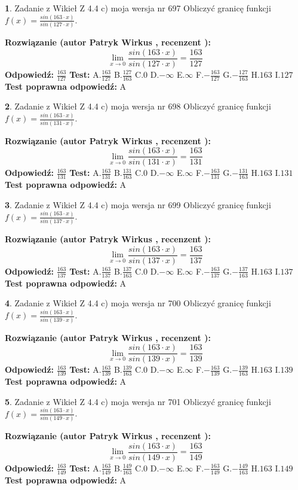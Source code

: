 \documentclass[12pt, a4paper]{article}
\theoremstyle{definition} %
\newtheorem{zad}{}
\newcommand{\zadStart}[1]{\begin{zad}#1\newline}
\newcommand{\zadStop}{\end{zad}}
\newcommand{\rozwStart}[2]{\noindent \textbf{Rozwiązanie (autor #1 , recenzent #2): }\newline}
\newcommand{\rozwStop}{\newline}
\newcommand{\odpStart}{\noindent \textbf{Odpowiedź:}\newline}
\newcommand{\odpStop}{\newline}
\newcommand{\testStart}{\noindent \textbf{Test:}\newline}
\newcommand{\testStop}{\newline}
\newcommand{\kluczStart}{\noindent \textbf{Test poprawna odpowiedź:}\newline}
\newcommand{\kluczStop}{\newline}
\begin{document}
\zadStart{Zadanie z Wikieł Z 4.4 c) moja wersja nr 697}
Obliczyć granicę funkcji $f(x)=\frac{sin(163\cdot x)}{sin(127\cdot x)}$.
\zadStop
\rozwStart{Patryk Wirkus}{}
$$\lim\limits_{x\to 0}\frac{sin(163\cdot x)}{sin(127\cdot x)}=
\frac{163}{127}$$
\rozwStop
\odpStart
$\frac{163}{127}$
\odpStop
\testStart
A.$\frac{163}{127}$
B.$\frac{127}{163}$
C.$0$
D.$-\infty$
E.$\infty$
F.$-\frac{163}{127}$
G.$-\frac{127}{163}$
H.$163$
I.$127$
\testStop
\kluczStart
A
\kluczStop



\zadStart{Zadanie z Wikieł Z 4.4 c) moja wersja nr 698}
Obliczyć granicę funkcji $f(x)=\frac{sin(163\cdot x)}{sin(131\cdot x)}$.
\zadStop
\rozwStart{Patryk Wirkus}{}
$$\lim\limits_{x\to 0}\frac{sin(163\cdot x)}{sin(131\cdot x)}=
\frac{163}{131}$$
\rozwStop
\odpStart
$\frac{163}{131}$
\odpStop
\testStart
A.$\frac{163}{131}$
B.$\frac{131}{163}$
C.$0$
D.$-\infty$
E.$\infty$
F.$-\frac{163}{131}$
G.$-\frac{131}{163}$
H.$163$
I.$131$
\testStop
\kluczStart
A
\kluczStop



\zadStart{Zadanie z Wikieł Z 4.4 c) moja wersja nr 699}
Obliczyć granicę funkcji $f(x)=\frac{sin(163\cdot x)}{sin(137\cdot x)}$.
\zadStop
\rozwStart{Patryk Wirkus}{}
$$\lim\limits_{x\to 0}\frac{sin(163\cdot x)}{sin(137\cdot x)}=
\frac{163}{137}$$
\rozwStop
\odpStart
$\frac{163}{137}$
\odpStop
\testStart
A.$\frac{163}{137}$
B.$\frac{137}{163}$
C.$0$
D.$-\infty$
E.$\infty$
F.$-\frac{163}{137}$
G.$-\frac{137}{163}$
H.$163$
I.$137$
\testStop
\kluczStart
A
\kluczStop



\zadStart{Zadanie z Wikieł Z 4.4 c) moja wersja nr 700}
Obliczyć granicę funkcji $f(x)=\frac{sin(163\cdot x)}{sin(139\cdot x)}$.
\zadStop
\rozwStart{Patryk Wirkus}{}
$$\lim\limits_{x\to 0}\frac{sin(163\cdot x)}{sin(139\cdot x)}=
\frac{163}{139}$$
\rozwStop
\odpStart
$\frac{163}{139}$
\odpStop
\testStart
A.$\frac{163}{139}$
B.$\frac{139}{163}$
C.$0$
D.$-\infty$
E.$\infty$
F.$-\frac{163}{139}$
G.$-\frac{139}{163}$
H.$163$
I.$139$
\testStop
\kluczStart
A
\kluczStop



\zadStart{Zadanie z Wikieł Z 4.4 c) moja wersja nr 701}
Obliczyć granicę funkcji $f(x)=\frac{sin(163\cdot x)}{sin(149\cdot x)}$.
\zadStop
\rozwStart{Patryk Wirkus}{}
$$\lim\limits_{x\to 0}\frac{sin(163\cdot x)}{sin(149\cdot x)}=
\frac{163}{149}$$
\rozwStop
\odpStart
$\frac{163}{149}$
\odpStop
\testStart
A.$\frac{163}{149}$
B.$\frac{149}{163}$
C.$0$
D.$-\infty$
E.$\infty$
F.$-\frac{163}{149}$
G.$-\frac{149}{163}$
H.$163$
I.$149$
\testStop
\kluczStart
A
\kluczStop
\end{document}
